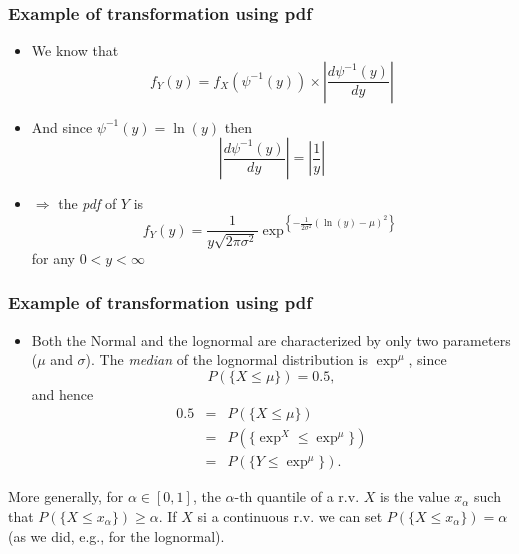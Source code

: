 \documentclass[notes=show,smaller,handout]{beamer}\usepackage[]{graphicx}\usepackage[]{color}
\renewcommand{\Pr}{P}
\newenvironment{stepitemize}{\begin{itemize}[<+->]}{\end{itemize} }
\begin{document}
\begin{frame}%

\frametitle{Example of transformation using pdf}
\begin{example}[cont'd]
\begin{stepitemize}
\item We know that
\begin{equation*}
f_{Y}\left( y\right) =f_{X}\left( \psi ^{-1}\left( y\right) \right) \times
\left\vert \frac{d\psi ^{-1}\left( y\right) }{dy}\right\vert
\end{equation*}

\item And since $\psi ^{-1}\left( y\right) =\ln (y)$ then
\begin{equation*}
\left\vert \frac{d\psi ^{-1}\left( y\right) }{dy}\right\vert =\left\vert
\frac{1}{y}\right\vert
\end{equation*}

\item $\Rightarrow $ the \emph{pdf} of $Y$ is
\begin{equation*}
f_{Y}\left( y\right) =\frac{1}{y\sqrt{2\pi \sigma ^{2}}}\exp^{ \left\{ -\frac{1%
}{2\sigma ^{2}}\left( \ln (y)-\mu \right) ^{2}\right\}}
\end{equation*}%
for any $0<y<\infty $
\end{stepitemize}
\end{example}
\end{frame}

\begin{frame}

\frametitle{Example of transformation using pdf}
\begin{example}[cont'd]
\begin{stepitemize}
\item Both the Normal and the lognormal are characterized by
only two parameters ($\mu$ and $\sigma$). The \emph{median} of the lognormal distribution is $\exp^{
\mu } $, since $$
\Pr \left( \{ X\leq \mu \} \right) = 0.5,
$$
and hence%
\begin{eqnarray*}
0.5 &=&\Pr \left(\{ X\leq \mu \}\right) \\
&=&\Pr \left( \{\exp^{X} \leq \exp^{ \mu }\} \right) \\
&=&\Pr \left( \{Y\leq \exp^{ \mu }\} \right).
\end{eqnarray*}
\end{stepitemize}
\end{example}
More generally, for $\alpha\in[0,1]$, the $\alpha$-th quantile of a r.v. $X$ is the value $x_\alpha$ such that $P(\{X \leq x_\alpha\})\geq\alpha$. If $X$ si a continuous r.v.  we can set $P(\{X \leq x_\alpha\})=\alpha$ (as we did, e.g., for the lognormal).
\end{frame}
\end{document}
